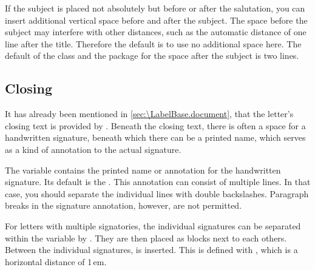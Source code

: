 \begin{Declaration}
\end{Declaration}
%
If the subject is placed not absolutely but before or after the salutation,
you can insert additional vertical space before and after the subject. The
space before the subject may interfere with other distances, such as the
automatic distance of one line after the title. Therefore the default is to
use no additional space here. The default of the class and the package for the
space after the subject is two lines.%
\EndIndexGroup
%
\EndIndexGroup


\subsection{Closing}
\BeginIndexGroup
{}

%
%
%

It has already been mentioned in \autoref{sec:\LabelBase.document},
 that the letter's closing text is
provided by . Beneath the
closing text, there is often a space for a handwritten signature, beneath
which there can be a printed name, which serves as a kind of annotation to the
actual signature.


\begin{Declaration}
\end{Declaration}
The  variable contains the printed name or annotation for
the handwritten signature. Its default  is the
. This annotation can
consist of multiple lines. In that case, you should separate the individual
lines with double backslashes. Paragraph breaks in the
signature annotation, however, are not permitted.

For letters with
multiple signatories, the individual signatures can be separated within the
 variable by . They are then placed as
blocks next to each others. Between the individual signatures,
 is inserted. This is defined with , which is a
horizontal distance of 1\,em.%
\EndIndexGroup


